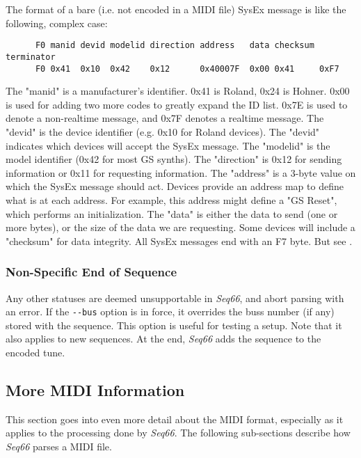    The format of a bare (i.e. not encoded in a MIDI file) SysEx message is
   like the following, complex case:

   \begin{verbatim}
      F0 manid devid modelid direction address   data checksum terminator
      F0 0x41  0x10  0x42    0x12      0x40007F  0x00 0x41     0xF7
   \end{verbatim}

   The "manid" is a manufacturer's identifier. 0x41 is Roland, 0x24 is
   Hohner. 0x00 is used for adding two more codes to greatly expand the ID
   list. 0x7E is used to denote a non-realtime message, and 0x7F denotes
   a realtime message.
   The "devid" is the device identifier (e.g. 0x10 for Roland devices).
   The "devid" indicates which devices will accept the SysEx message.
   The "modelid" is the model identifier (0x42 for most GS synths).
   The "direction" is 0x12 for sending information or 0x11 for requesting
   information.
   The "address" is a 3-byte value on which the SysEx message should act.
   Devices provide an address map to define what is at each address.
   For example, this address might define a "GS Reset", which performs
   an initialization.
   The "data" is either the data to send (one or more bytes), or the
   size of the data we are requesting.
   Some devices will include a "checksum" for data integrity.
   All SysEx messages end with an F7 byte.
   But see .

\subsubsection{Non-Specific End of Sequence}
\label{subsubsec:midi_format_meta_sequence_ends}

   Any other statuses are deemed unsupportable in \textsl{Seq66}, and
   abort parsing with an error.
   If the \texttt{-{}-bus} option is in force, it overrides the buss number (if
   any) stored with the sequence.  This option is useful for testing a setup.
   Note that it also applies to new sequences.
   At the end, \textsl{Seq66} adds the sequence to the encoded tune.

\subsection{More MIDI Information}
\label{subsec:midi_information_more}

   This section goes into even more detail about the MIDI format, especially as
   it applies to the processing done by \textsl{Seq66}.
   The following sub-sections describe how \textsl{Seq66}
   parses a MIDI file.

